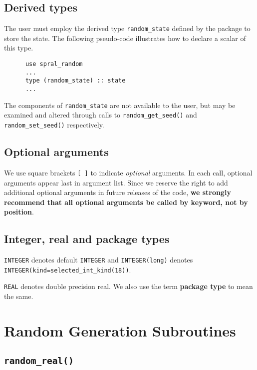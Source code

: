 
\subsection{Derived types} \label{derived types}

The user must employ the derived type {\tt random\_state} defined by the
package to store the state. 
The following pseudo-code illustrates how to declare a scalar of this type.
\begin{verbatim}
      use spral_random
      ...
      type (random_state) :: state
      ...
\end{verbatim}
The components of {\tt random\_state} are not available to the user, but
may be examined and altered through calls to {\tt random\_get\_seed()} and
{\tt random\_set\_seed()} respectively.

\subsection{Optional arguments}\label{Optional arguments}

We use square brackets {\tt [ ]} to indicate {\it optional} arguments.
In each
call, optional arguments appear last in argument list.  Since we
reserve the right to add additional optional arguments in future
releases of the code, {\bf we strongly recommend that all optional
arguments be called by keyword, not by position}.

\subsection{Integer, real and package types}\label{Integer kinds}

{\tt INTEGER} denotes default {\tt INTEGER} and
{\tt INTEGER(long)} denotes {\tt INTEGER(kind=selected\_int\_kind(18))}.

\noindent
{\tt REAL} denotes double precision real.
We also use the term {\bf package type} to mean the same.


\section{Random Generation Subroutines}


\subsection{\texttt{random\_real()}}

